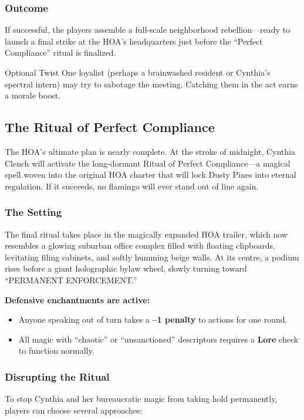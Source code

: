 \begin{multicols}{2}
\subsubsection*{Outcome}
If successful, the players assemble a full-scale neighborhood rebellion—ready to launch a final strike at the HOA's headquarters just before the “Perfect Compliance” ritual is finalized.

\begin{CommentBox}{Optional Twist}
    One loyalist (perhaps a brainwashed resident or Cynthia’s spectral intern) may try to sabotage the meeting. Catching them in the act earns a morale boost.
\end{CommentBox}


\subsection{The Ritual of Perfect Compliance}

The HOA’s ultimate plan is nearly complete. At the stroke of midnight, Cynthia Clench will activate the long-dormant Ritual of Perfect Compliance—a magical spell woven into the original HOA charter that will lock Dusty Pines into eternal regulation. If it succeeds, no flamingo will ever stand out of line again.

\subsubsection*{The Setting}
The final ritual takes place in the magically expanded HOA trailer, which now resembles a glowing suburban office complex filled with floating clipboards, levitating filing cabinets, and softly humming beige walls. At its centre, a podium rises before a giant holographic bylaw wheel, slowly turning toward “PERMANENT ENFORCEMENT.”

\textbf{Defensive enchantments are active:}
\begin{itemize}
    \item Anyone speaking out of turn takes a \textbf{–1 penalty} to actions for one round.
    \item All magic with “chaotic” or “unsanctioned” descriptors requires a \textbf{Lore}  check to function normally.
\end{itemize}

\subsubsection*{Disrupting the Ritual}
To stop Cynthia and her bureaucratic magic from taking hold permanently, players can choose several approaches:


\end{multicols}
